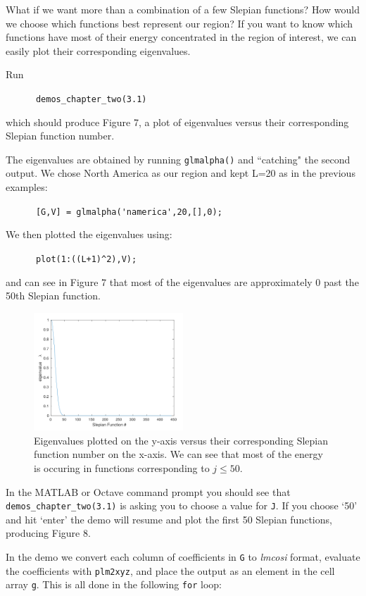 \documentclass[11pt]{article}
\begin{document}
What if we want more than a combination of a few Slepian functions? How would we choose which functions best represent our region? If you want to know which functions have most of their energy concentrated in the region of interest, we can easily plot their corresponding eigenvalues.

Run

\verb|		demos_chapter_two(3.1)|

which should produce Figure 7, a plot of eigenvalues versus their corresponding Slepian function number.

The eigenvalues are obtained by running \verb|glmalpha()| and ``catching" the second output. We chose North America as our region and kept L=20 as in the previous examples:

\verb|		[G,V] = glmalpha('namerica',20,[],0);|

We then plotted the eigenvalues using:

\verb|		plot(1:((L+1)^2),V);|

and can see in Figure 7 that most of the eigenvalues are approximately 0 past the 50th Slepian function. 

\begin{figure}[H]
  \centering
  \includegraphics[width=0.5\textwidth]{figures/figure7.png}
  \caption{Eigenvalues plotted on the y-axis versus their corresponding Slepian function number on the x-axis. We can see that most of the energy is occuring in functions corresponding to $j\leq50$.}
\label{figure7}
\end{figure}

In the MATLAB or Octave command prompt you should see that \verb|demos_chapter_two(3.1)| is asking you to choose a value for \verb|J|.  If you choose `50' and hit `enter' the demo will resume and plot the first 50 Slepian functions, producing Figure 8.

In the demo we convert each column of coefficients in \verb|G| to \textit{lmcosi} format, evaluate the coefficients with \verb|plm2xyz|, and place the output as an element in the cell array \verb|g|. This is all done in the following \verb|for| loop:
\end{document}
